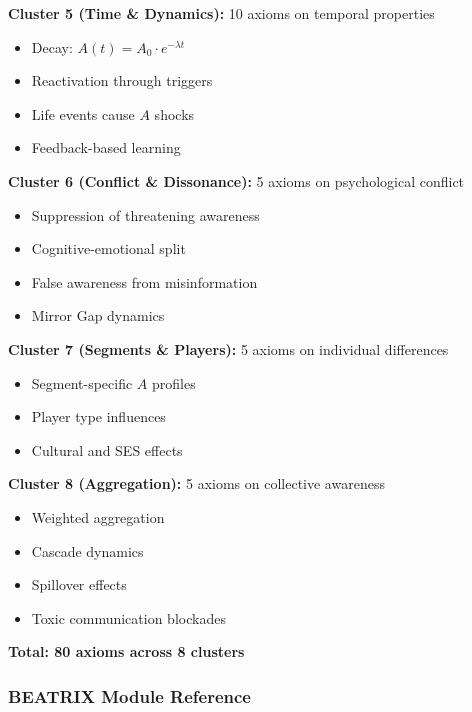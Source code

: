 \begin{tcolorbox}[colback=gray!5!white, colframe=gray!75!black, title=Axiom Clusters 5--8 Summary]

\textbf{Cluster 5 (Time \& Dynamics):} 10 axioms on temporal properties
\begin{itemize}
\item Decay: $A(t) = A_0 \cdot e^{-\lambda t}$
\item Reactivation through triggers
\item Life events cause $A$ shocks
\item Feedback-based learning
\end{itemize}

\textbf{Cluster 6 (Conflict \& Dissonance):} 5 axioms on psychological conflict
\begin{itemize}
\item Suppression of threatening awareness
\item Cognitive-emotional split
\item False awareness from misinformation
\item Mirror Gap dynamics
\end{itemize}

\textbf{Cluster 7 (Segments \& Players):} 5 axioms on individual differences
\begin{itemize}
\item Segment-specific $A$ profiles
\item Player type influences
\item Cultural and SES effects
\end{itemize}

\textbf{Cluster 8 (Aggregation):} 5 axioms on collective awareness
\begin{itemize}
\item Weighted aggregation
\item Cascade dynamics
\item Spillover effects
\item Toxic communication blockades
\end{itemize}

\textbf{Total: 80 axioms across 8 clusters}

\end{tcolorbox}

\subsubsection{BEATRIX Module Reference}

